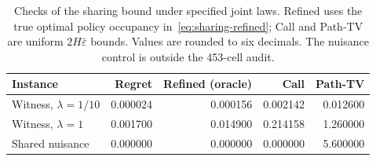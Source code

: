 \begin{table}[htb]
\centering\small
\begin{tabular}{lrrrr}
\toprule
Instance & Regret & Refined (oracle) & Call & Path-TV \\
\midrule
Witness, $\lambda=1/10$ & 0.000024 & 0.000156 & 0.002142 & 0.012600 \\
Witness, $\lambda=1$ & 0.001700 & 0.014900 & 0.214158 & 1.260000 \\
Shared nuisance & 0.000000 & 0.000000 & 0.000000 & 5.600000 \\
\bottomrule
\end{tabular}
\caption{Checks of the sharing bound under specified joint laws. Refined uses
the true optimal policy occupancy in~\eqref{eq:sharing-refined}; Call and Path-TV
are uniform $2H\bar\varepsilon$ bounds. Values are rounded to six decimals.
The nuisance control is outside the 453-cell audit.}
\label{tab:robustness-bounds}
\end{table}
